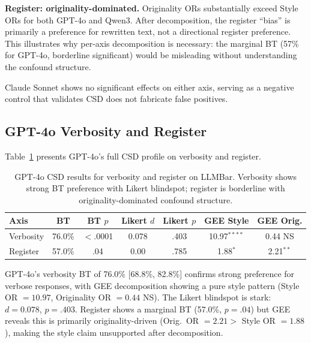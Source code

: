 \documentclass[11pt,a4paper]{article}
\newcommand{\csd}{\textsc{CSD}}
\begin{document}
\textbf{Register: originality-dominated.} Originality ORs substantially exceed Style ORs for both GPT-4o and Qwen3. After decomposition, the register ``bias'' is primarily a preference for rewritten text, not a directional register preference. This illustrates why per-axis decomposition is necessary: the marginal BT (57\% for GPT-4o, borderline significant) would be misleading without understanding the confound structure.

Claude Sonnet shows no significant effects on either axis, serving as a negative control that validates \csd{} does not fabricate false positives.

\subsection{GPT-4o Verbosity and Register}
\label{sec:gpt4o-verb}

Table~\ref{tab:gpt4o_verb} presents GPT-4o's full CSD profile on verbosity and register.

\begin{table}[t]
\centering
\small
\caption{GPT-4o CSD results for verbosity and register on LLMBar. Verbosity shows strong BT preference with Likert blindspot; register is borderline with originality-dominated confound structure.}
\label{tab:gpt4o_verb}
\begin{tabular}{lcccccc}
\toprule
\textbf{Axis} & \textbf{BT} & \textbf{BT $p$} & \textbf{Likert $d$} & \textbf{Likert $p$} & \textbf{GEE Style} & \textbf{GEE Orig.} \\
\midrule
Verbosity & 76.0\% & $<$.0001 & 0.078 & .403 & 10.97$^{****}$ & 0.44 NS \\
Register  & 57.0\% & .04 & 0.00 & .785 & 1.88$^{*}$ & 2.21$^{**}$ \\
\bottomrule
\end{tabular}
\end{table}

GPT-4o's verbosity BT of 76.0\% [68.8\%, 82.8\%] confirms strong preference for verbose responses, with GEE decomposition showing a pure style pattern (Style OR $= 10.97$, Originality OR $= 0.44$ NS). The Likert blindspot is stark: $d = 0.078$, $p = .403$. Register shows a marginal BT (57.0\%, $p = .04$) but GEE reveals this is primarily originality-driven (Orig.\ OR $= 2.21 > $ Style OR $= 1.88$), making the style claim unsupported after decomposition.
\end{document}

